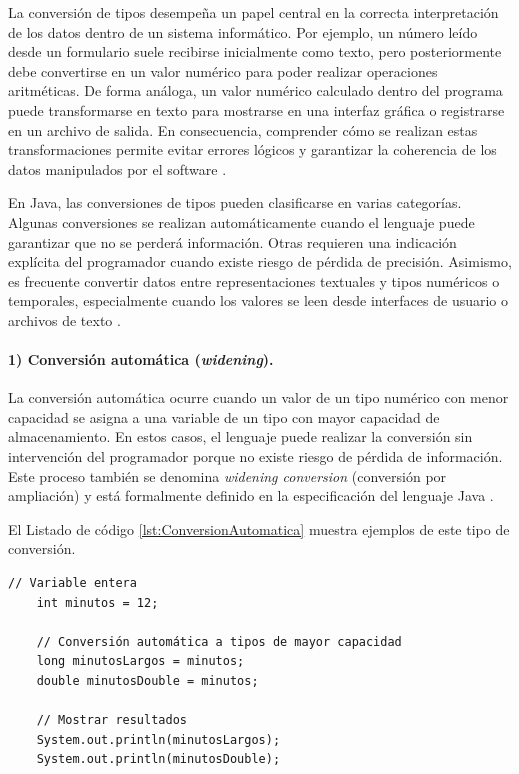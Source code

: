 \documentclass[12pt,twoside]{book}
\begin{document}
						La conversión de tipos desempeña un papel central en la correcta interpretación de los datos dentro de un sistema informático. Por ejemplo, un número leído desde un formulario suele recibirse inicialmente como texto, pero posteriormente debe convertirse en un valor numérico para poder realizar operaciones aritméticas. De forma análoga, un valor numérico calculado dentro del programa puede transformarse en texto para mostrarse en una interfaz gráfica o registrarse en un archivo de salida. En consecuencia, comprender cómo se realizan estas transformaciones permite evitar errores lógicos y garantizar la coherencia de los datos manipulados por el software \cite{Bloch2018EffectiveJava,Sommerville2015Software}.
						
						En Java, las conversiones de tipos pueden clasificarse en varias categorías. Algunas conversiones se realizan automáticamente cuando el lenguaje puede garantizar que no se perderá información. Otras requieren una indicación explícita del programador cuando existe riesgo de pérdida de precisión. Asimismo, es frecuente convertir datos entre representaciones textuales y tipos numéricos o temporales, especialmente cuando los valores se leen desde interfaces de usuario o archivos de texto \cite{Gosling2014JavaLanguageSpec}.
						
						\paragraph{1) Conversión automática (\textit{widening}).}
						La conversión automática ocurre cuando un valor de un tipo numérico con menor capacidad se asigna a una variable de un tipo con mayor capacidad de almacenamiento. En estos casos, el lenguaje puede realizar la conversión sin intervención del programador porque no existe riesgo de pérdida de información. Este proceso también se denomina \textit{widening conversion} (conversión por ampliación) y está formalmente definido en la especificación del lenguaje Java \cite{Gosling2014JavaLanguageSpec}.
						
						El Listado de código \ref{lst:ConversionAutomatica} muestra ejemplos de este tipo de conversión.
						
						\begin{lstlisting}[style=Java,caption={Conversión automática: int a long y double.},label={lst:ConversionAutomatica}]
	// Variable entera
	int minutos = 12;
	
	// Conversión automática a tipos de mayor capacidad
	long minutosLargos = minutos;
	double minutosDouble = minutos;
	
	// Mostrar resultados
	System.out.println(minutosLargos);
	System.out.println(minutosDouble); \end{lstlisting}
						
\end{document}
